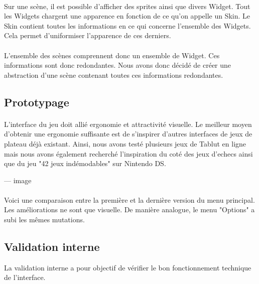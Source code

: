 \documentclass[11pt]{article} %
\begin{document}
\paragraph{}
Sur une scène, il est possible d'afficher des sprites ainsi que divers Widget. Tout les Widgets chargent une apparence en fonction de ce qu'on appelle un Skin. Le Skin contient toutes les informations en ce qui concerne l'ensemble des Widgets. Cela permet d'uniformiser l'apparence de ces derniers.
\paragraph{}
L'ensemble des scènes comprennent donc un ensemble de Widget. Ces informations sont donc redondantes. Nous avons donc décidé de créer une abstraction d'une scène contenant toutes ces informations redondantes.

\subsection{Prototypage}
\paragraph{}
L'interface du jeu doit allié ergonomie et attractivité visuelle. Le meilleur moyen d'obtenir une ergonomie suffisante est de s'inspirer d'autres interfaces de jeux de plateau déjà existant. Ainsi, nous avons testé plusieurs jeux de Tablut en ligne mais nous avons également recherché l'inspiration du coté des jeux d'echecs ainsi que du jeu "42 jeux indémodables" sur Nintendo DS.

--- image

\paragraph{}
Voici une comparaison entre la première et la dernière version du menu principal. Les améliorations ne sont que visuelle. De manière analogue, le menu "Options" a subi les mêmes mutations. 

\paragraph{}


\subsection{Validation interne}

La validation interne a pour objectif de vérifier le bon fonctionnement technique de l'interface.
\end{document}
